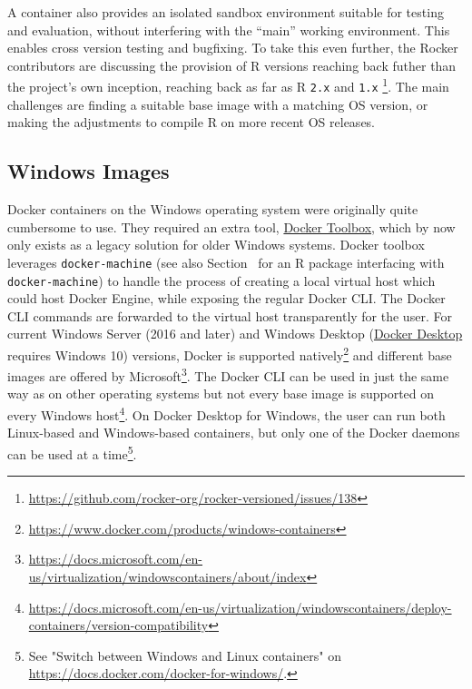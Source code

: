 A container also provides an isolated sandbox environment suitable for
testing and evaluation, without interfering with the ``main'' working
environment. This enables cross version testing and bugfixing. To take
this even further, the Rocker contributors are discussing the provision
of R versions reaching back futher than the project's own inception,
reaching back as far as R \texttt{2.x} and \texttt{1.x}
\footnote{\href{https://github.com/rocker-org/rocker-versioned/issues/138}{https://github.com/rocker-org/rocker-versioned/issues/138}}.
The main challenges are finding a suitable base image with a matching OS
version, or making the adjustments to compile R on more recent OS
releases.

\hypertarget{windows-images}{%
\subsection{Windows Images}\label{windows-images}}

Docker containers on the Windows operating system were originally quite
cumbersome to use. They required an extra tool,
\href{https://docs.docker.com/toolbox/}{Docker Toolbox}, which by now
only exists as a legacy solution for older Windows systems. Docker
toolbox leverages \texttt{docker-machine} (see also
Section~ for an R package interfacing with
\texttt{docker-machine}) to handle the process of creating a local
virtual host which could host Docker Engine, while exposing the regular
Docker CLI. The Docker CLI commands are forwarded to the virtual host
transparently for the user. For current Windows Server (2016 and later)
and Windows Desktop
(\href{https://www.docker.com/products/docker-desktop}{Docker Desktop}
requires Windows 10) versions, Docker is supported
natively\footnote{\href{https://www.docker.com/products/windows-containers}{https://www.docker.com/products/windows-containers}}
and different base images are offered by
Microsoft\footnote{\href{https://docs.microsoft.com/en-us/virtualization/windowscontainers/about/index}{https://docs.microsoft.com/en-us/virtualization/windowscontainers/about/index}}.
The Docker CLI can be used in just the same way as on other operating
systems but not every base image is supported on every Windows
host\footnote{\href{https://docs.microsoft.com/en-us/virtualization/windowscontainers/deploy-containers/version-compatibility}{https://docs.microsoft.com/en-us/virtualization/windowscontainers/deploy-containers/version-compatibility}}.
On Docker Desktop for Windows, the user can run both Linux-based and
Windows-based containers, but only one of the Docker daemons can be used
at a
time\footnote{See "Switch between Windows and Linux containers" on \href{https://docs.docker.com/docker-for-windows/}{https://docs.docker.com/docker-for-windows/}.}.

